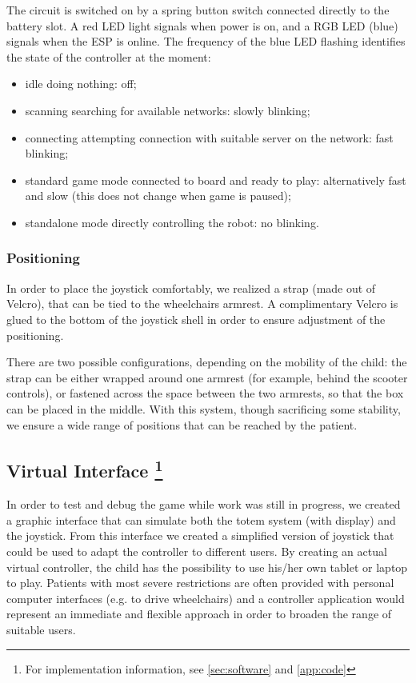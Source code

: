 \documentclass[a4paper,twoside]{book}
\begin{document}
The circuit is switched on by a spring button switch connected directly to the battery slot. A red LED light signals when power is on, and a RGB LED (blue) signals when the ESP is online. The frequency of the blue LED flashing identifies the state of the controller at the moment:
\begin{itemize}
\item idle \textemdash doing nothing: off;
\item scanning \textemdash searching for available networks: slowly blinking;
\item connecting \textemdash attempting connection with suitable server on the network: fast blinking;
\item standard game mode \textemdash connected to board and ready to play: alternatively fast and slow (this does not change when game is paused);
\item standalone mode \textemdash directly controlling the robot: no blinking.
\end{itemize}


\subsubsection{Positioning}

In order to place the joystick comfortably, we realized a strap (made out of Velcro), that can be tied to the wheelchairs armrest. A complimentary Velcro is glued to the bottom of the joystick shell in order to ensure adjustment of the positioning. 

There are two possible configurations, depending on the mobility of the child: the strap can be either wrapped around one armrest (for example, behind the scooter controls), or fastened across the space between the two armrests, so that the box can be placed in the  middle. With this system, though sacrificing some stability, we ensure a wide range of positions that can be reached by the patient.

\subsection[Virtual Interface]{Virtual Interface \footnote{For implementation information, see \autoref{sec:software} and \autoref{app:code}}}
\label{ssec:vint}
In order to test and debug the game while work was still in progress, we created a graphic interface that can simulate both the totem system (with display) and the joystick. From this interface we created a simplified version of joystick that could be used to adapt the controller to different users. By creating an actual virtual controller, the child has the possibility to use his/her own tablet or laptop to play. Patients with most severe restrictions are often provided with personal computer interfaces (e.g. to drive wheelchairs) and a controller application would represent an immediate and flexible approach in order to broaden the range of suitable users.

\end{document}
